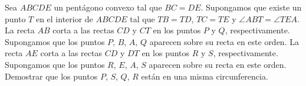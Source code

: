 Sea $ABCDE$ un pentágono convexo tal que $BC=DE$. Supongamos que existe un punto $T$ en el interior de $ABCDE$ tal que $TB=TD$, $TC=TE$ y $\angle ABT = \angle TEA$. La recta $AB$ corta a las rectas $CD$ y $CT$ en los puntos $P$ y $Q$, respectivamente. Supongamos que los puntos $P$, $B$, $A$, $Q$ aparecen sobre su recta en este orden. La recta $AE$ corta a las rectas $CD$ y $DT$ en los puntos $R$ y $S$, respectivamente. Supongamos que los puntos $R$, $E$, $A$, $S$ aparecen sobre su recta en este orden. Demostrar que los puntos $P$, $S$, $Q$, $R$ están en una misma circunferencia.